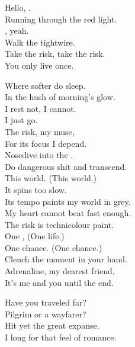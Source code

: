 
Hello, . \\
Running through the red light. \\
, yeah. \\
Walk the tightwire. \\
Take the risk, take the risk. \\
You only live once. \\


Where softer  do sleep. \\
In the hush of morning's glow. \\
I rest not, I cannot. \\
I just go. \\

The risk, my muse, \\
For its focus I depend. \\
Nosedive into the . \\
Do dangerous shit and transcend. \\

This world. (This world.) \\
It spins too slow. \\
Its tempo paints my world in grey. \\
My heart cannot beat fast enough. \\
The risk is technicolour paint. \\

One , (One life.) \\
One chance. (One chance.) \\
Clench the moment in your hand. \\
Adrenaline, my dearest friend, \\
It's me and you until the end. \\




Have you traveled far? \\
Pilgrim or a wayfarer? \\
Hit yet the great expanse. \\
I long for that feel of romance. \\

